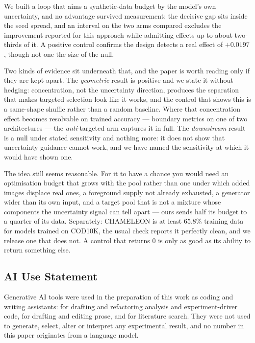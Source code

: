 \documentclass{article} %
\begin{document}
We built a loop that aims a synthetic-data budget by the model's own uncertainty, and no advantage
survived measurement: the decisive gap sits inside the seed spread, and an interval on the two arms
compared excludes the improvement reported for this approach while admitting effects up to about
two-thirds of it. A positive control confirms the design detects a real effect of $+0.0197$, though
not one the size of the null.

Two kinds of evidence sit underneath that, and the paper is worth reading only if they are kept
apart. The \emph{geometric} result is positive and we state it without hedging: concentration, not
the uncertainty direction, produces the separation that makes targeted selection look like it works,
and the control that shows this is a same-shape shuffle rather than a random baseline. Where that
concentration effect becomes resolvable on trained accuracy --- boundary metrics on one of two
architectures --- the \emph{anti}-targeted arm captures it in full. The \emph{downstream} result is a
null under stated sensitivity and nothing more: it does not show that uncertainty guidance cannot
work, and we have named the sensitivity at which it would have shown one.

The idea still seems reasonable. For it to have a chance you would need an optimisation budget that
grows with the pool rather than one under which added images displace real ones, a foreground supply
not already exhausted, a generator wider than its own input, and a target pool that is not a mixture
whose components the uncertainty signal can tell apart --- ours sends half its budget to a quarter of
its data. Separately: CHAMELEON is at least $65.8\%$ training data for models trained on COD10K,
the usual check reports it perfectly clean, and we release one that does not. A control that returns
$0$ is only as good as its ability to return something else.

\subsection*{AI Use Statement}

Generative AI tools were used in the preparation of this work as coding and writing assistants:
for drafting and refactoring analysis and experiment-driver code, for drafting and editing prose,
and for literature search. They were not used to generate, select, alter or interpret any
experimental result, and no number in this paper originates from a language model.
\end{document}
